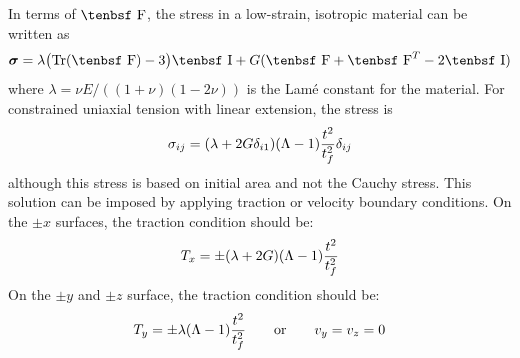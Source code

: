 \documentclass[11pt]{book}
\newcommand{\tens}[1]{\boldsymbol{\mathsf{#1}}}
\def\F{\hbox{\tenbsf F}}
\def\I{\hbox{\tenbsf I}}
\begin{document}
In terms of $\F$, the stress in a low-strain, isotropic material can be written as
\begin{equation}
    \tens{\sigma} = \lambda \bigl({\rm Tr}(\F)-3\bigr)\I + G(\F + \F^T -2\I)
\end{equation}
where $\lambda = \nu E/((1+\nu)(1-2\nu))$ is the Lam\'e constant for the material. For constrained uniaxial tension with linear extension, the stress is
\begin{equation}
    \sigma_{ij} = (\lambda  + 2G\delta_{i1})(\Lambda-1){t^2\over t_f^2}\delta_{ij}
\end{equation}
although this stress is based on initial area and not the Cauchy stress. This solution can be imposed by applying traction or velocity boundary conditions. On the $\pm x$ surfaces, the traction condition should be:
\begin{equation}
            T_x = \pm (\lambda  + 2G)(\Lambda-1){t^2\over t_f^2} 
\end{equation}
On the $\pm y$ and $\pm z$ surface, the traction condition should be:
\begin{equation}
            T_y = \pm \lambda(\Lambda-1){t^2\over t_f^2}   \qquad{\rm or}\qquad v_y = v_z = 0
\end{equation}
\end{document}
